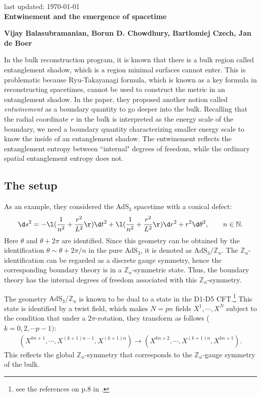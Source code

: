 \documentclass[12pt]{article}
\date{}
\renewcommand{\thefootnote}{\fnsymbol{footnote}}
\newcommand{\conical}[0]{\mathrm{AdS}_3/\mathbb Z_n}
\begin{document}
{\Large{}
\hfill{\normalsize last updated: \today}
\\[2mm]
\textbf{Entwinement and the emergence of spacetime\cite{Balasubramanian:2014sra}
}
}

\noindent
\hfill
\textbf{Vijay Balasubramanian, Borun D. Chowdhury, Bartlomiej Czech, Jan de Boer}%

\renewcommand{\thefootnote}{\arabic{footnote})}
\setcounter{footnote}{0}
\vspace{12pt}
\noindent
In the bulk reconstruction program, it is known that there is a bulk region called entanglement shadow, which is a region minimal surfaces cannot enter.
This is problematic because Ryu-Takayanagi formula, which is known as a key formula in reconstructing spacetimes, cannot be used to construct the metric in an entanglement shadow.
In the paper, they proposed another notion called \textit{entwinement} as a boundary quantity to go deeper into the bulk.
Recalling that the radial coordinate $r$ in the bulk is interpreted as the energy scale of the boundary, we need a boundary quantity characterizing smaller energy scale to know the inside of an entanglement shadow.
The entwinement reflects the entanglement entropy between ``internal" degrees of freedom, while the ordinary spatial entanglement entropy does not.

\subsection*{The setup}
As an example, they considered the AdS$_3$ spacetime with a conical defect:
\begin{align}
	\d s^2 = -\l(\frac{1}{n^2}+\frac{r^2}{L^2}\r)\d t^2 + \l(\frac{1}{n^2}+\frac{r^2}{L^2}\r)\d r^2 + r^2\d\theta^2,
	\qquad n\in \mathbb N.\label{eq: conical AdS}
\end{align}
Here $\theta$ and $\theta + 2\pi$ are identified.
Since this geometry can be obtained by the identification $\theta\sim \theta + 2\pi/n$ in the pure AdS$_3$, it is denoted as $\conical$.
The $\mathbb Z_n$-identification can be regarded as a discrete gauge symmetry, hence the corresponding boundary theory is in a $\mathbb Z_n$-symmetric state.
Thus, the boundary theory has the internal degrees of freedom associated with this $\mathbb Z_n$-symmetry.

The geometry $\conical$ is known to be dual to a state in the D1-D5 CFT.\footnote{see the references on p.8 in \cite{Balasubramanian:2014sra}.}
This state is identified by a twist field, which makes $N = pn$ fields $X^{1},\cdots,X^{N}$ subject to the condition that under a $2\pi$-rotation, they transform as follows ($k=0,2,\cdots p-1)$:
\begin{align}
	(X^{kn + 1},\cdots,X^{(k+1)n-1} ,X^{(k+1)n}) \rightarrow (X^{kn +2},\cdots, X^{(k+1)n},X^{kn+1}).
\end{align}
This reflects the global $\mathbb Z_n$-symmetry that corresponds to the $\mathbb Z_n$-gauge symmetry of the bulk.
\end{document}
